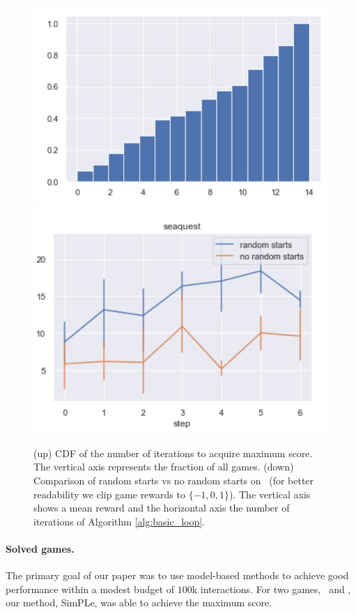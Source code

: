 \begin{figure}[t]
\includegraphics[width=0.90\columnwidth]{figures/cdf_max_attained}\hfill
\includegraphics[width=0.90\columnwidth]{figures/random_starts_ablations}
\caption{(up) CDF of the number of iterations to acquire maximum score. The vertical axis represents the fraction of all games. (down) Comparison of random starts vs no random starts on \seaquest\, (for better readability we clip game rewards to $\{-1,0,1\}$). The vertical axis shows a mean reward and the horizontal axis the number of iterations of Algorithm \ref{alg:basic_loop}. }
\label{fig:Cdf}
\end{figure}

\paragraph{Solved games.} 
The primary goal of our paper was to use model-based methods to achieve good performance within a modest budget of $100$k interactions. For two games, \pong\, and \freeway, our method, SimPLe, was able to achieve the maximum score.

